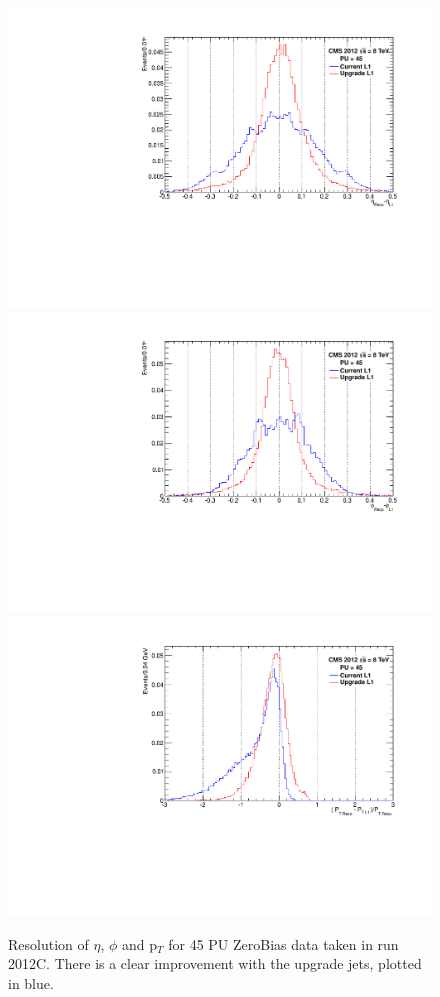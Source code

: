 \begin{figure}[t!]
\begin{center}
  \includegraphics[scale=0.32]{Figures/l1jets//etaRes.pdf}
    \includegraphics[scale=0.32]{Figures/l1jets//phiRes.pdf}
       \includegraphics[scale=0.32]{Figures/l1jets//ptRes.pdf} 
\caption{Resolution of $\eta$, $\phi$ and p$_{T}$ for 45 PU ZeroBias data taken in run 2012C. There is a clear improvement with the upgrade jets, plotted in blue.}
\label{JetRes}
\end{center}
\end{figure}

